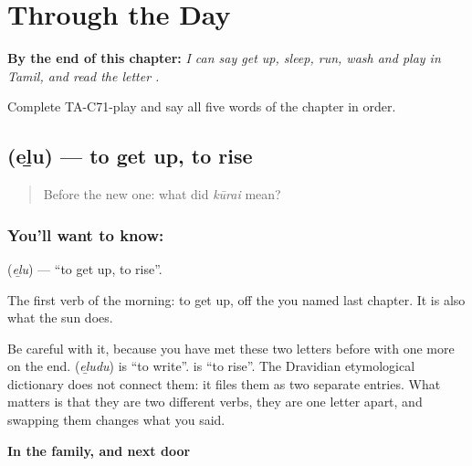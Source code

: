 
\chapter{Through the Day}
\label{ch:ta-through-the-day}

\begin{chapteropening}
\textbf{By the end of this chapter:} \emph{I can say get up, sleep, run, wash and play in Tamil, and read the letter .}

Complete TA-C71-play and say all five words of the chapter in order.
\end{chapteropening}

\section[\texorpdfstring{\ta{எழு} (eḻu)}{எழு (eḻu)}]{ (eḻu) — to get up, to rise}

\label{lesson:TA-C71-rise}



\begin{quote}
Before the new one: what did \emph{kūrai} mean?
\end{quote}

\subsection*{You'll want to know: }
\textbf{} (\emph{eḻu}) — \textquotedblleft{}to get up, to rise\textquotedblright{}.

The first verb of the morning: to get up, off the  you named last chapter. It is also what the sun does.

Be careful with it, because you have met these two letters before with one more on the end.  (\emph{eḻudu}) is \textquotedblleft{}to write\textquotedblright{}.  is \textquotedblleft{}to rise\textquotedblright{}. The Dravidian etymological dictionary does not connect them: it files them as two separate entries. What matters is that they are two different verbs, they are one letter apart, and swapping them changes what you said.

\textbf{In the family, and next door}


